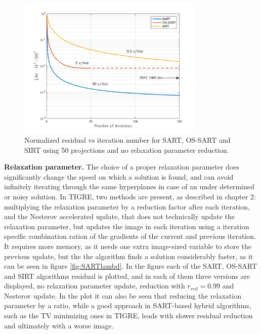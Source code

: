 \begin{figure}[H]
\begin{center}

\includegraphics[width=0.8\textwidth]{Applications/SARTtypes.png} 
\end{center}

\caption[Nomralized residual vs iteration of SART/OS-SART/SIRT]{\label{fig:SARTtypesconv} Normalized residual vs iteration number for SART, OS-SART and SIRT using 50 projections and no relaxation parameter reduction.} 
\end{figure}

\textbf{Relaxation parameter.} The choice of a proper relaxation parameter does significantly change the speed on which a solution is found, and can avoid infinitely iterating through the same hyperplanes in case of an under determined or noisy solution. In TIGRE, two methods are present, as described in chapter 2: multiplying the relaxation parameter by a reduction factor after each iteration, and the Nesterov accelerated update, that does not technically update the relaxation parameter, but updates the image in each iteration using a iteration specific combination ration of the gradients of the current and previous iteration. It requires more memory, as it needs one extra image-sized variable to store the previous update, but the the algorithm finds a solution considerably faster, as it can be seen in figure \ref{fig:SARTlambd}. In the figure each of the SART, OS-SART and SIRT algorithms residual is plotted, and in each of them three versions are displayed, no relaxation parameter update, reduction with $r_{red}=0.99$ and Nesterov update. In the plot it can also be seen that reducing the relaxation parameter by a ratio, while a good approach in SART-based hybrid algorithms, such as the TV minimizing ones in TIGRE, leads with slower residual reduction and ultimately with a worse image.

